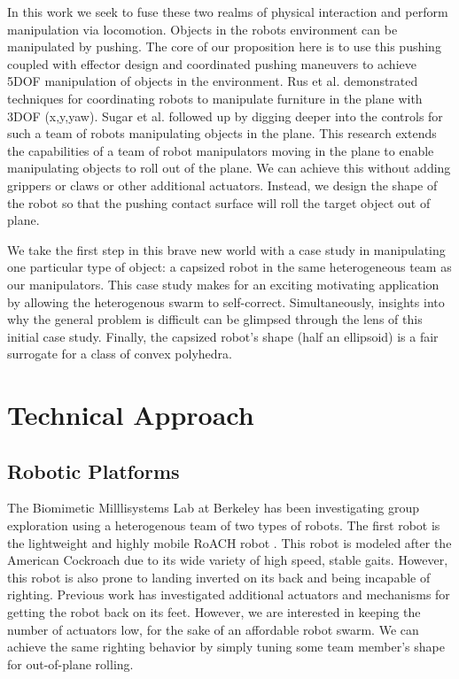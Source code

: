 \documentclass[runningheads,a4paper]{llncs}
\begin{document}
In this work we seek to fuse these two realms of physical interaction and perform manipulation via locomotion.
Objects in the robots environment can be manipulated by pushing.
The core of our proposition here is to use this pushing coupled with effector design and coordinated pushing maneuvers to achieve 5DOF manipulation of objects in the environment.
Rus et al.\cite{rus1995moving} demonstrated techniques for coordinating robots to manipulate furniture in the plane with 3DOF (x,y,yaw).
Sugar et al. \cite{sugar2002control} followed up by digging deeper into the controls for such a team of robots manipulating objects in the plane.
This research extends the capabilities of a team of robot manipulators moving in the plane to enable manipulating objects to roll out of the plane.
We can achieve this without adding grippers or claws or other additional actuators.
Instead, we design the shape of the robot so that the pushing contact surface will roll the target object out of plane.

We take the first step in this brave new world with a case study in manipulating one particular type of object: a capsized robot in the same heterogeneous team as our manipulators.
This case study makes for an exciting motivating application by allowing the heterogenous swarm to self-correct.
Simultaneously, insights into why the general problem is difficult can be glimpsed through the lens of this initial case study.
Finally, the capsized robot's shape (half an ellipsoid) is a fair surrogate for a class of convex polyhedra.

\clearpage
\section{Technical Approach}
\subsection{Robotic Platforms}
The Biomimetic Milllisystems Lab at Berkeley has been investigating group exploration using a heterogenous team of two types of robots.
The first robot is the lightweight and highly mobile RoACH robot \cite{RoACH}.
This robot is modeled after the American Cockroach due to its wide variety of high speed, stable gaits.
However, this robot is also prone to landing inverted on its back and being incapable of righting.
Previous work has investigated additional actuators and mechanisms for getting the robot back on its feet.
However, we are interested in keeping the number of actuators low, for the sake of an affordable robot swarm.
We can achieve the same righting behavior by simply tuning some team member's shape for out-of-plane rolling.
\end{document}
